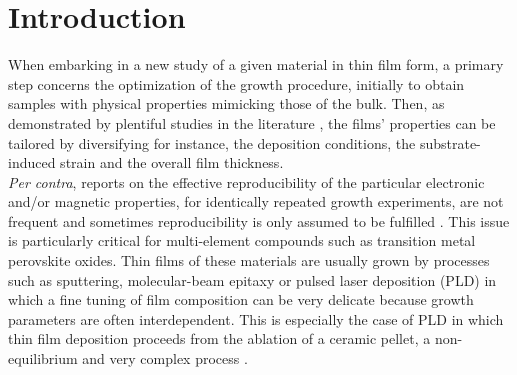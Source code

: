 \documentclass[aip,graphicx,numerical]{revtex4-1}
\begin{document}
\pacs{}%

\maketitle %

\section{Introduction}
When embarking in a new study of a given material in thin film form, a primary step concerns the optimization of the growth procedure, initially to obtain samples with physical properties mimicking those of the bulk. Then, as demonstrated by plentiful studies in the literature\cite{growthmode2016} , the films' properties can be tailored by diversifying for instance, the deposition conditions, the substrate-induced strain\cite{Schlom2007} and the overall film thickness.\\
\textit{Per contra}, reports on the effective reproducibility of the particular electronic and/or magnetic properties, for identically repeated growth experiments, are not frequent and sometimes reproducibility is only assumed to be fulfilled \cite{Baker_2016} . This issue is particularly critical for multi-element compounds such as transition metal perovskite oxides. Thin films of these materials are usually grown by processes such as sputtering, molecular-beam epitaxy or pulsed laser deposition (PLD) in which a fine tuning of film composition can be very delicate because growth parameters are often interdependent. This is especially the case of PLD in which thin film deposition proceeds from the ablation of a ceramic pellet, a non-equilibrium and very complex process \cite{PLDeltit} .\\
\end{document}
